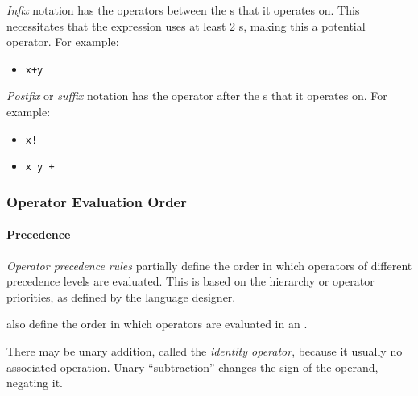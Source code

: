 \begin{definition}[Infix]\label{def:Fixity-Infix}
  \emph{Infix} notation has the operators between the s that it operates on.
  This necessitates that the expression uses at least 2 s, making this a potential  operator.
  For example:
  \begin{itemize}[noitemsep]
  \item \texttt{x+y}
  \end{itemize}
\end{definition}

\begin{definition}[Suffix]\label{def:Fixity-Suffix}
  \emph{Postfix} or \emph{suffix} notation has the operator after the s that it operates on.
  For example:
  \begin{itemize}[noitemsep]
  \item \texttt{x!}
  \item \texttt{x y +}
  \end{itemize}
\end{definition}

\subsubsection{Operator Evaluation Order}\label{subsubsec:Operator_Evaluation_Order}
\paragraph{Precedence}\label{par:Operator_Evaluation_Order-Precedence}
\begin{definition}\label{def:Operator_Precedence_Rules}
  \emph{Operator precedence rules} partially define the order in which operators of different precedence levels are evaluated.
  This is based on the hierarchy or operator priorities, as defined by the language designer.

  \begin{remark}
     also define the order in which operators are evaluated in an .
  \end{remark}
\end{definition}

There may be unary addition, called the \emph{identity operator}, because it usually no associated operation.
Unary ``subtraction'' changes the sign of the operand, negating it.

